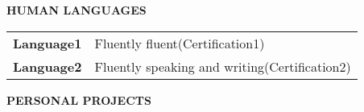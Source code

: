 \documentclass[11pt,english]{article}
\begin{document}
\medskip

\selectfont

\hspace{-20mm}\colorbox{maincolor}{\begin{minipage}[t][8mm][c]{75mm}
\hspace{20mm}\bfseries \color{white}  HUMAN LANGUAGES
\end{minipage}}
\vspace{6mm}

\begin{minipage}{\textwidth}


  \begin{tabular}{ @{} p{32mm} p{135mm} @{} }
  
    \bf {Language1} & {\small Fluently fluent\small\color{maingrey}\hspace{1mm}(Certification1)} \\
  
    \bf {Language2} & {\small Fluently speaking and writing\small\color{maingrey}\hspace{1mm}(Certification2)} \\
  
  \end{tabular}
  \vspace{50mm}


\end{minipage}%
%
%
%
%
%
%
%

\medskip

\selectfont

\hspace{-20mm}\colorbox{maincolor}{\begin{minipage}[t][8mm][c]{75mm}
\hspace{20mm}\bfseries \color{white}  PERSONAL PROJECTS
\end{minipage}}
\vspace{6mm}
\end{document}
